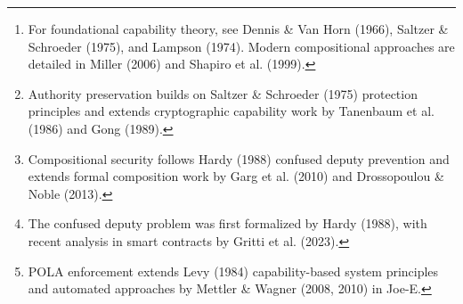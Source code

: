 

\begin{abstract}
This chapter presents the formal verification of Lion's capability-based security system through four fundamental theorems.\footnote{For foundational capability theory, see Dennis \& Van Horn (1966), Saltzer \& Schroeder (1975), and Lampson (1974). Modern compositional approaches are detailed in Miller (2006) and Shapiro et al. (1999).} The capability security framework provides the mathematical foundation for secure component composition, authority management, and access control in the Lion microkernel ecosystem. We prove that capability authority is preserved across component boundaries, security properties compose, confused deputy attacks are prevented, and the Principle of Least Authority is automatically enforced.

\vspace{0.5cm}

\textbf{Key Contributions:}
\begin{enumerate}
\item \textbf{Cross-Component Capability Flow}: Formal proof that capability authority is preserved with unforgeable references\footnote{Authority preservation builds on Saltzer \& Schroeder (1975) protection principles and extends cryptographic capability work by Tanenbaum et al. (1986) and Gong (1989).}
\item \textbf{Security Composition}: Mathematical proof that component composition preserves individual security properties\footnote{Compositional security follows Hardy (1988) confused deputy prevention and extends formal composition work by Garg et al. (2010) and Drossopoulou \& Noble (2013).}
\item \textbf{Confused Deputy Prevention}: Formal proof that eliminating ambient authority prevents confused deputy attacks\footnote{The confused deputy problem was first formalized by Hardy (1988), with recent analysis in smart contracts by Gritti et al. (2023).}
\item \textbf{Automatic POLA Enforcement}: Proof that Lion's type system automatically enforces the Principle of Least Authority\footnote{POLA enforcement extends Levy (1984) capability-based system principles and automated approaches by Mettler \& Wagner (2008, 2010) in Joe-E.}
\end{enumerate}
\end{abstract}

\vspace{0.5cm}

